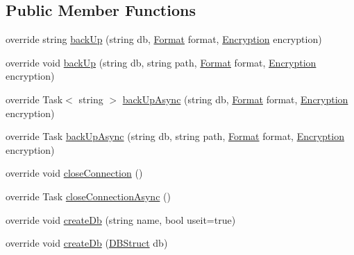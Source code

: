 \subsection*{Public Member Functions}
\begin{DoxyCompactItemize}
\item 
override string \mbox{\hyperlink{class_n_t_k_1_1_database_1_1_n_t_k_d___sqlite_a6331e5614526c861e24a1d92e7a257f8}{back\+Up}} (string db, \mbox{\hyperlink{namespace_n_t_k_1_1_database_a9bed700210ca4ed5854002637b664789}{Format}} format, \mbox{\hyperlink{namespace_n_t_k_1_1_database_aa21afe93187a6c77c4ccdc988b3c4ac2}{Encryption}} encryption)
\item 
override void \mbox{\hyperlink{class_n_t_k_1_1_database_1_1_n_t_k_d___sqlite_a0d116fe17ff3d51e88baebcb5286d1e3}{back\+Up}} (string db, string path, \mbox{\hyperlink{namespace_n_t_k_1_1_database_a9bed700210ca4ed5854002637b664789}{Format}} format, \mbox{\hyperlink{namespace_n_t_k_1_1_database_aa21afe93187a6c77c4ccdc988b3c4ac2}{Encryption}} encryption)
\item 
override Task$<$ string $>$ \mbox{\hyperlink{class_n_t_k_1_1_database_1_1_n_t_k_d___sqlite_ae2d64f4c7ed5628b5e55dd8651099739}{back\+Up\+Async}} (string db, \mbox{\hyperlink{namespace_n_t_k_1_1_database_a9bed700210ca4ed5854002637b664789}{Format}} format, \mbox{\hyperlink{namespace_n_t_k_1_1_database_aa21afe93187a6c77c4ccdc988b3c4ac2}{Encryption}} encryption)
\item 
override Task \mbox{\hyperlink{class_n_t_k_1_1_database_1_1_n_t_k_d___sqlite_a0340b672129a87c96b5f6bea8839a01c}{back\+Up\+Async}} (string db, string path, \mbox{\hyperlink{namespace_n_t_k_1_1_database_a9bed700210ca4ed5854002637b664789}{Format}} format, \mbox{\hyperlink{namespace_n_t_k_1_1_database_aa21afe93187a6c77c4ccdc988b3c4ac2}{Encryption}} encryption)
\item 
override void \mbox{\hyperlink{class_n_t_k_1_1_database_1_1_n_t_k_d___sqlite_a36b5c0b45b522901901555dd1bbae968}{close\+Connection}} ()
\item 
override Task \mbox{\hyperlink{class_n_t_k_1_1_database_1_1_n_t_k_d___sqlite_ae728bf6ed129be1e86b382152394cd7c}{close\+Connection\+Async}} ()
\item 
override void \mbox{\hyperlink{class_n_t_k_1_1_database_1_1_n_t_k_d___sqlite_a4d3c7928cae114bc6ceb2baff425ce99}{create\+Db}} (string name, bool useit=true)
\item 
override void \mbox{\hyperlink{class_n_t_k_1_1_database_1_1_n_t_k_d___sqlite_a3fb51dacb629d8c0d01a22ba3f9c4716}{create\+Db}} (\mbox{\hyperlink{class_n_t_k_1_1_database_1_1_d_b_struct}{D\+B\+Struct}} db)

\end{DoxyCompactItemize}
